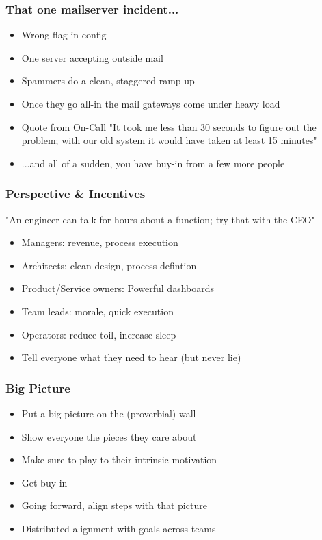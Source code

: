 \documentclass[t]{beamer}
\begin{document}
\begin{frame}
	\frametitle{That one mailserver incident...}
	\begin{itemize}
		\item Wrong flag in config
		\item One server accepting outside mail
		\item Spammers do a clean, staggered ramp-up
		\item Once they go all-in the mail gateways come under heavy load
		\item Quote from On-Call "It took me less than 30 seconds to figure out the problem; with our old system it would have taken at least 15 minutes"
		\item ...and all of a sudden, you have buy-in from a few more people
	\end{itemize}
\end{frame}

\begin{frame}
	\frametitle{Perspective \& Incentives}
	"An engineer can talk for hours about a function; try that with the CEO"
	\vfill
	\begin{itemize}
		\item Managers: revenue, process execution
		\item Architects: clean design, process defintion
		\item Product/Service owners: Powerful dashboards
		\item Team leads: morale, quick execution
		\item Operators: reduce toil, increase sleep
		\item Tell everyone what they need to hear (but never lie)
	\end{itemize}
	\vfill
\end{frame}

\begin{frame}
	\frametitle{Big Picture}
	\begin{itemize}
		\item Put a big picture on the (proverbial) wall
		\item Show everyone the pieces they care about
		\item Make sure to play to their intrinsic motivation
		\item Get buy-in
		\item Going forward, align steps with that picture
		\item Distributed alignment with goals across teams
	\end{itemize}
\end{frame}
\end{document}
